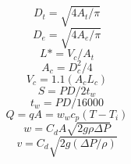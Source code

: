 \begin{equation}
D_{t} = \sqrt{4 A_{t} / \pi}
\end{equation}
\begin{equation}
D_{e} = \sqrt{4 A_{e} / \pi}
\end{equation}
\begin{equation}
L* = V_{c}/A_{t}
\end{equation}
\begin{equation}
A_{c} = D_{c}^{2}/4
\end{equation}
\begin{equation}
V_{c} = 1.1(A_{c}L_{c})
\end{equation}
\begin{equation}
S = PD/2t_{w}
\end{equation}
\begin{equation}
t_{w} = PD/16000
\end{equation}
\begin{equation}
Q = q A = w_{w} c_{p} (T-T_{i})
\end{equation}
\begin{equation}
w = C_{d} A \sqrt{2 g \rho \Delta P}
\end{equation}
\begin{equation}
v = C_{d} \sqrt{2 g (\Delta P/\rho)}
\end{equation}






